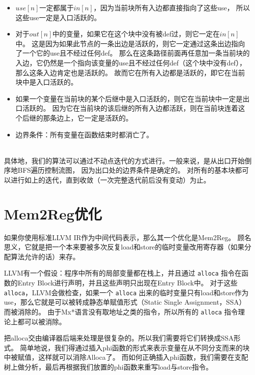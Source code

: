 \begin{itemize}
\item $use[n]$一定都属于$in[n]$，因为当前块所有入边都直接指向了这些use，
所以这些use一定是入口活跃的。

\item 对于$out[n]$中的变量，如果它在这个块中没有被def过，则它一定在$in[n]$中。
这是因为如果此节点的一条出边是活跃的，则它一定通过这条出边指向了一个它的use且不经过任何def。
那么在这条路径前面再任意加一条当前块的入边，它仍然是一个指向该变量的use且不经过任何def（这个块中没有def），那么这条入边肯定也是活跃的。
故而它在所有入边都是活跃的，即它在当前块中是入口活跃的。

\item 如果一个变量在当前块的某个后继中是入口活跃的，则它在当前块中一定是出口活跃的。
因为它在当前块的该后继的所有入边都活跃，则在当前块连着这个后继的那条边上，它一定是活跃的。

\item 边界条件：所有变量在函数结束时都消亡了。
\end{itemize}
~\\


具体地，我们的算法可以通过不动点迭代的方式进行。一般来说，是从出口开始倒序地BFS遍历控制流图，
因为出口处的边界条件是确定的。
对所有的基本块都可以进行如上的迭代，直到收敛（一次完整迭代前后没有变动）为止。

\section{Mem2Reg优化}

如果你使用标准LLVM IR作为中间代码表示，那么其一个优化是Mem2Reg。
顾名思义，它就是把一个本来要被多次反复load和store的临时变量改用寄存器（如果分配算法允许的话）来存。

LLVM有一个假设：程序中所有的局部变量都在栈上，并且通过 \texttt{alloca} 指令在函数的Entry Block进行声明，并且这些声明只出现在Entry Block中。
对于这些 \texttt{alloca}，LLVM会做检查，如果一个 \texttt{alloca} 出来的临时变量只有load和store作为use，那么它就是可以被转成静态单赋值形式（Static Single Assignment，SSA）而被消除的。
由于Mx*语言没有取地址之类的指令，所以所有的 \texttt{alloca} 指令理论上都可以被消除。

把alloca交由编译器后端来处理是很复杂的。所以我们需要将它们转换成SSA形式。
简单地说，我们得通过插入phi函数的形式来表示变量在从不同分支而来的块中被赋值，这样就可以消除Alloca了。
而如何正确插入phi函数，我们需要在支配树上做分析，最后再根据我们放置的phi函数来重写load与store指令。

